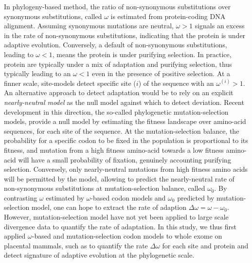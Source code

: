 \documentclass{article}
\begin{document}
In phylogeny-based method, the ratio of non-synonymous substitutions over synonymous substitutions, called $\omega$ is estimated from protein-coding DNA alignment\cite{muse_likelihood_1994,goldman_codon-based_1994}.
Assuming synonymous mutations are neutral, $\omega>1$ signals an excess in the rate of non-synonymous substitutions, indicating that the protein is under adaptive evolution.
Conversely, a default of non-synonymous substitutions, leading to $\omega<1$, means the protein is under purifying selection.
In practice, protein are typically under a mix of adaptation and purifying selection, thus typically leading to an $\omega<1$ even in the presence of positive selection.
At a finner scale, site-models detect specific site ($i$) of the sequence with an $\omega^{(i)}>1$\cite{yang_codon-substitution_2000, kosiol_patterns_2008}.
An alternative approach to detect adaptation would be to rely on an explicit \textit{nearly-neutral model} as the null model against which to detect deviation.
Recent development in this direction, the so-called phylogenetic mutation-selection models, provide a null model by estimating the fitness landscape over amino-acid sequences, for each site of the sequence\cite{yang_mutation-selection_2008, halpern_evolutionary_1998, rodrigue_mechanistic_2010}.
At the mutation-selection balance, the probability for a specific codon to be fixed in the population is proportional to its fitness, and mutation from a high fitness amino-acid towards a low fitness amino-acid will have a small probability of fixation, genuinely accounting purifying selection.
Conversely, only nearly-neutral mutations from high fitness amino acids will be permitted by the model, allowing to predict the nearly-neutral rate of non-synonymous substitutions at mutation-selection balance, called $\omega_{0}$.
By contrasting $\omega$ estimated by $\omega$-based codon models and $\omega_{0}$ predicted by mutation-selection model, one can hope to extract the rate of adaption $\Delta \omega = \omega - \omega_{0}$.
However, mutation-selection model have not yet been applied to large scale divergence data to quantify the rate of adaptation\cite{rodrigue_detecting_2016}.
In this study, we thus first applied $\omega$-based and mutation-selection codon models to whole exome on placental mammals, such as to quantify the rate $\Delta \omega$ for each site and protein and detect signature of adaptive evolution at the phylogenetic scale.
\end{document}
